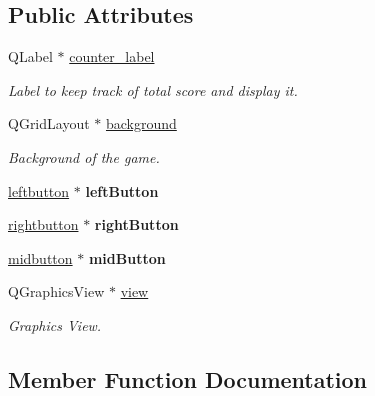 \subsection*{Public Attributes}
\begin{DoxyCompactItemize}
\item 
\mbox{\label{classgame2_a0375921b8927efec242f61d868de0c9a}} 
Q\+Label $\ast$ \hyperlink{classgame2_a0375921b8927efec242f61d868de0c9a}{counter\+\_\+label}
\begin{DoxyCompactList}\small\item\em Label to keep track of total score and display it. \end{DoxyCompactList}\item 
\mbox{\label{classgame2_a6ee0d244c43062475f0c72eb9b698e46}} 
Q\+Grid\+Layout $\ast$ \hyperlink{classgame2_a6ee0d244c43062475f0c72eb9b698e46}{background}
\begin{DoxyCompactList}\small\item\em Background of the game. \end{DoxyCompactList}\item 
\mbox{\label{classgame2_abb0710dc45b20d3fa634616415dca500}} 
\hyperlink{classleftbutton}{leftbutton} $\ast$ {\bfseries left\+Button}
\item 
\mbox{\label{classgame2_ae0df4aa49cf727c59bb9a82ec699b579}} 
\hyperlink{classrightbutton}{rightbutton} $\ast$ {\bfseries right\+Button}
\item 
\mbox{\label{classgame2_a05923f1dd5bd72763730557ee472c438}} 
\hyperlink{classmidbutton}{midbutton} $\ast$ {\bfseries mid\+Button}
\item 
\mbox{\label{classgame2_ab25b8f61e668504361a5146864a11aed}} 
Q\+Graphics\+View $\ast$ \hyperlink{classgame2_ab25b8f61e668504361a5146864a11aed}{view}
\begin{DoxyCompactList}\small\item\em Graphics View. \end{DoxyCompactList}\end{DoxyCompactItemize}


\subsection{Member Function Documentation}
\mbox{\label{classgame2_a8d1b4b72e005fb59df223b5df7757d43}} 
